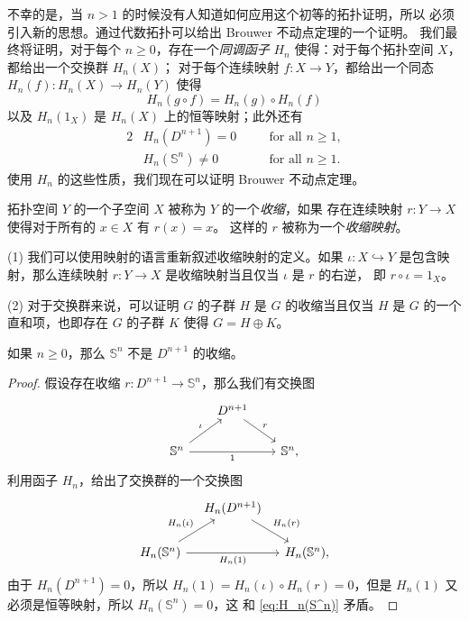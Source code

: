 \documentclass[fontset=none]{Notes}
\begin{document}
不幸的是，当 $n>1$ 的时候没有人知道如何应用这个初等的拓扑证明，所以
必须引入新的思想。通过代数拓扑可以给出 Brouwer 不动点定理的一个证明。
我们最终将证明，对于每个 $n\geq 0$，存在一个\emph{同调函子} $H_n$
使得：对于每个拓扑空间 $X$，都给出一个交换群 $H_n(X)$；
对于每个连续映射 $f:X\to Y$，都给出一个同态 $H_n(f):H_n(X)\to H_n(Y)$
使得
\begin{equation}
  H_n(g\circ f)=H_n(g)\circ H_n(f)
\end{equation}
以及 $H_n(1_X)$ 是 $H_n(X)$ 上的恒等映射；此外还有
\begin{alignat}{2}
  &H_n(D^{n+1})=0 &\quad &\text{for all $n\geq 1$},\\
  &H_n(\mathbb{S}^{n})\neq 0 &&\text{for all $n\geq 1$}
  \label{eq:H_n(S^n)}.
\end{alignat}
使用 $H_n$ 的这些性质，我们现在可以证明 Brouwer 不动点定理。

\begin{definition}
  拓扑空间 $Y$ 的一个子空间 $X$ 被称为 $Y$ 的一个\emph{收缩}，如果
  存在连续映射 $r:Y\to X$ 使得对于所有的 $x\in X$ 有 $r(x)=x$。
  这样的 $r$ 被称为一个\emph{收缩映射}。
\end{definition}

\begin{remark}
  (1)
  我们可以使用映射的语言重新叙述收缩映射的定义。如果 $\iota:X\hookrightarrow Y$
  是包含映射，那么连续映射 $r:Y\to X$ 是收缩映射当且仅当 $\iota$ 是 $r$ 的右逆，
  即 $r\circ\iota=1_X$。

  (2) 对于交换群来说，可以证明 $G$ 的子群 $H$ 是 $G$ 的收缩当且仅当 
  $H$ 是 $G$ 的一个直和项，也即存在 $G$ 的子群 $K$ 使得 $G=H\oplus K$。
\end{remark}

\begin{lemma}\label{lemma:S^n is not retract of D^n+1}
  如果 $n\geq 0$，那么 $\mathbb{S}^n$ 不是 $D^{n+1}$ 的收缩。
\end{lemma}
\begin{proof}
  假设存在收缩 $r:D^{n+1}\to \mathbb{S}^n$，那么我们有交换图
  \[
    \begin{tikzcd}[column sep=1.8em]
      & D^{n+1}\arrow[dr,"r"] & \\
      \mathbb{S}^n\arrow[ur,"\iota"]\arrow[rr,"1"'] & & \mathbb{S}^n ,
    \end{tikzcd}
  \]
  利用函子 $H_n$，给出了交换群的一个交换图
  \[
    \begin{tikzcd}[column sep=1em]
      & H_n(D^{n+1})\arrow[dr,"H_n(r)"] & \\
      H_n(\mathbb{S}^n)\arrow[ur,"H_n(\iota)"]\arrow[rr,"H_n(1)"'] & & 
      H_n(\mathbb{S}^n ),
    \end{tikzcd}
  \]
  由于 $H_n(D^{n+1})=0$，所以 $H_n(1)=H_n(\iota)\circ H_n(r)=0$，但是
  $H_n(1)$ 又必须是恒等映射，所以 $H_n(\mathbb{S}^n)=0$，这
  和 \eqref{eq:H_n(S^n)} 矛盾。
\end{proof}
\end{document}
